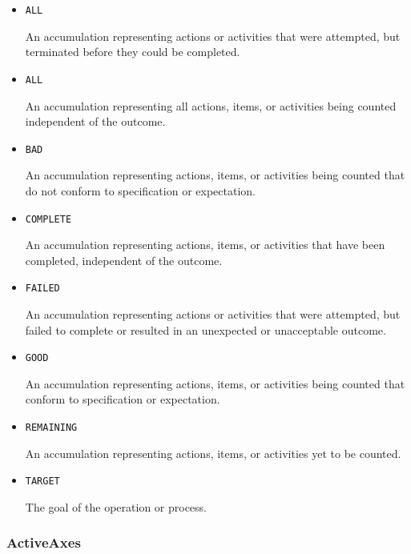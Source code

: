 \begin{itemize}

\item \texttt{ALL}


An accumulation representing actions or activities that were attempted, but terminated before they could be completed.

\item \texttt{ALL}


An accumulation representing all actions, items, or activities being counted independent of the outcome.

\item \texttt{BAD}


An accumulation representing actions, items, or activities being counted that do not conform to specification or expectation.

\item \texttt{COMPLETE}


An accumulation representing actions, items, or activities that have been completed, independent of the outcome.

\item \texttt{FAILED}


An accumulation representing actions or activities that were attempted, but failed to
complete or resulted in an unexpected or unacceptable outcome.

\item \texttt{GOOD}


An accumulation representing actions, items, or activities being counted that conform to specification or expectation.

\item \texttt{REMAINING}


An accumulation representing actions, items, or activities yet to be counted.

\item \texttt{TARGET}


The goal of the operation or process.


\end{itemize}











\subsubsection{ActiveAxes}
\label{sec:ActiveAxes}



